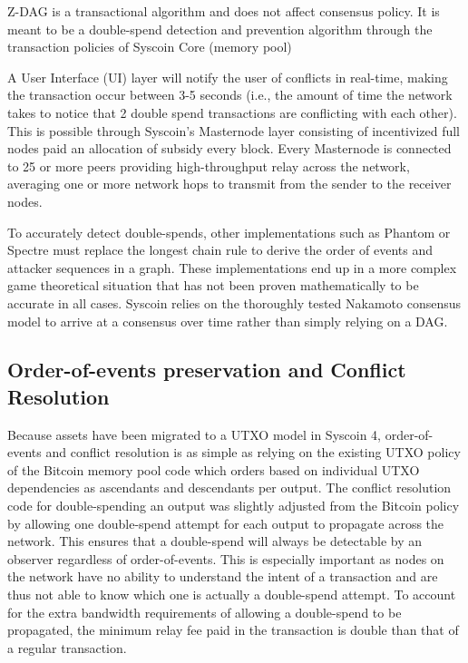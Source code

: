 \documentclass[peerreview]{ieeesyscoin}
\begin{document}
Z-DAG is a transactional algorithm and does not affect consensus policy. It is meant to be a double-spend detection and prevention algorithm through the transaction policies of Syscoin Core (memory pool)

A User Interface (UI) layer will notify the user of conflicts in real-time, making the transaction occur between 3-5 seconds (i.e., the amount of time the network takes to notice that 2 double spend transactions are conflicting with each other). This is possible through Syscoin’s Masternode layer consisting of incentivized full nodes paid an allocation of subsidy every block. Every Masternode is connected to 25 or more peers providing high-throughput relay across the network, averaging one or more network hops to transmit from the sender to the receiver nodes.

To accurately detect double-spends, other implementations such as Phantom \cite{Som18} or Spectre \cite{Som15} must replace the longest chain rule to derive the order of events and attacker sequences in a graph.
These implementations end up in a more complex game theoretical situation that has not  been proven mathematically to be accurate in all cases. Syscoin relies on the thoroughly tested Nakamoto consensus model to arrive at a consensus over time rather than simply relying on a DAG.

\subsection{Order-of-events preservation and Conflict Resolution}
Because assets have been migrated to a UTXO model in Syscoin 4, order-of-events and conflict resolution is as simple as relying on the existing UTXO policy of the Bitcoin memory pool code which orders based on individual UTXO dependencies as ascendants and descendants per output. The conflict resolution code for double-spending an output was slightly adjusted from the Bitcoin policy by allowing one double-spend attempt for each output to propagate across the network. This ensures that a double-spend will always be detectable by an observer regardless of order-of-events. This is especially important as nodes on the network have no ability to understand the intent of a transaction and are thus not able to know which one is actually a double-spend attempt. To account for the extra bandwidth requirements of allowing a double-spend to be propagated, the minimum relay fee paid in the transaction is double than that of a regular transaction. 
\end{document}

